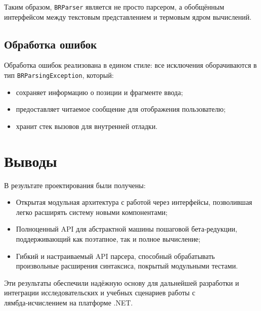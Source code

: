 Таким образом, \texttt{BRParser} является не просто парсером, а обобщённым интерфейсом между текстовым представлением и термовым ядром вычислений.

\subsection{Обработка ошибок}

Обработка ошибок реализована в едином стиле: все исключения оборачиваются в тип \texttt{BRParsingException}, который:

\begin{itemize}
  \item сохраняет информацию о позиции и фрагменте ввода;
  \item предоставляет читаемое сообщение для отображения пользователю;
  \item хранит стек вызовов для внутренней отладки.
\end{itemize}


\section{Выводы}

В результате проектирования были получены:
\begin{itemize}
  \item Открытая модульная архитектура с работой через интерфейсы, позволившая легко расширять систему новыми компонентами;
  \item Полноценный API для абстрактной машины пошаговой бета‑редукции, поддерживающий как поэтапное, так и полное вычисление;
  \item Гибкий и настраиваемый API парсера, способный обрабатывать произвольные расширения синтаксиса, покрытый модульными тестами.
\end{itemize}

Эти результаты обеспечили надёжную основу для дальнейшей разработки и интеграции исследовательских и учебных сценариев работы с лямбда‑исчислением на платформе .NET.
